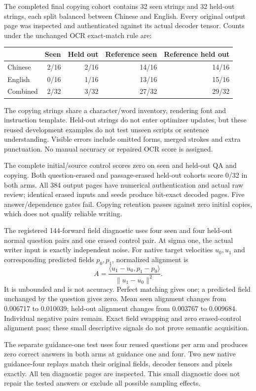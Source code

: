 The completed final copying cohort contains 32 seen strings and 32 held-out
strings, each split balanced between Chinese and English. Every original
output page was inspected and authenticated against its actual decoder tensor.
Counts under the unchanged OCR exact-match rule are:
\begin{center}
\begin{tabular}{lrrrr}
 & Seen & Held out & Reference seen & Reference held out \\
\hline
Chinese & 2/16 & 2/16 & 14/16 & 14/16 \\
English & 0/16 & 1/16 & 13/16 & 15/16 \\
Combined & 2/32 & 3/32 & 27/32 & 29/32 \\
\end{tabular}
\end{center}
The copying strings share a character/word inventory, rendering font and
instruction template. Held-out strings do not enter optimizer updates, but
these reused development examples do not test unseen scripts or sentence
understanding. Visible errors include omitted forms, merged strokes and extra
punctuation. No manual accuracy or repaired OCR score is assigned.

The complete initial/source control scores zero on seen and held-out QA and
copying. Both question-erased and passage-erased held-out cohorts score 0/32
in both arms. All 384 output pages have numerical authentication and actual
raw review; identical erased inputs and seeds produce bit-exact decoded pages.
Five answer/dependence gates fail. Copying retention passes against zero
initial copies, which does not qualify reliable writing.

The registered 144-forward field diagnostic uses four seen and four held-out
normal question pairs and one erased control pair. At sigma one, the actual
writer input is exactly independent noise. For native target velocities
$u_0,u_1$ and corresponding predicted fields $p_0,p_1$, normalized alignment is
\[
A=\frac{\langle u_1-u_0,p_1-p_0\rangle}{\|u_1-u_0\|^2}.
\]
It is unbounded and is not accuracy. Perfect matching gives one; a predicted
field unchanged by the question gives zero. Mean seen alignment changes from
0.006717 to 0.010039; held-out alignment changes from 0.003767 to 0.009684. Individual
negative pairs remain. Exact field swapping and zero erased-control alignment
pass; these small descriptive signals do not prove semantic acquisition.

The separate guidance-one test uses four reused questions per arm and produces
zero correct answers in both arms at guidance one and four. Two new native
guidance-four replays match their original fields, decoder tensors and pixels
exactly. All ten diagnostic pages are inspected. This small diagnostic does
not repair the tested answers or exclude all possible sampling effects.

